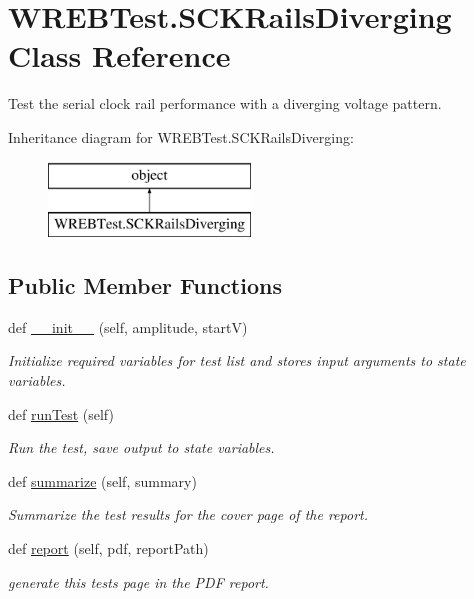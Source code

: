 \hypertarget{class_w_r_e_b_test_1_1_s_c_k_rails_diverging}{}\section{W\+R\+E\+B\+Test.\+S\+C\+K\+Rails\+Diverging Class Reference}
\label{class_w_r_e_b_test_1_1_s_c_k_rails_diverging}


Test the serial clock rail performance with a diverging voltage pattern.  


Inheritance diagram for W\+R\+E\+B\+Test.\+S\+C\+K\+Rails\+Diverging\+:\begin{figure}[H]
\begin{center}
\leavevmode
\includegraphics[height=2.000000cm]{class_w_r_e_b_test_1_1_s_c_k_rails_diverging}
\end{center}
\end{figure}
\subsection*{Public Member Functions}
\begin{DoxyCompactItemize}
\item 
def \hyperlink{class_w_r_e_b_test_1_1_s_c_k_rails_diverging_ab39e5d3330990a4f7bcd6ba455458c51}{\+\_\+\+\_\+init\+\_\+\+\_\+} (self, amplitude, startV)
\begin{DoxyCompactList}\small\item\em Initialize required variables for test list and stores input arguments to state variables. \end{DoxyCompactList}\item 
def \hyperlink{class_w_r_e_b_test_1_1_s_c_k_rails_diverging_a549807de798a22afefb13b25bdaf9dd1}{run\+Test} (self)
\begin{DoxyCompactList}\small\item\em Run the test, save output to state variables. \end{DoxyCompactList}\item 
def \hyperlink{class_w_r_e_b_test_1_1_s_c_k_rails_diverging_ad07c939b9865cd306161310c864ada90}{summarize} (self, summary)
\begin{DoxyCompactList}\small\item\em Summarize the test results for the cover page of the report. \end{DoxyCompactList}\item 
def \hyperlink{class_w_r_e_b_test_1_1_s_c_k_rails_diverging_ad9a2c00e928c5367e3dc75bc9ba398d6}{report} (self, pdf, report\+Path)
\begin{DoxyCompactList}\small\item\em generate this test\textquotesingle{}s page in the P\+DF report. \end{DoxyCompactList}\end{DoxyCompactItemize}


